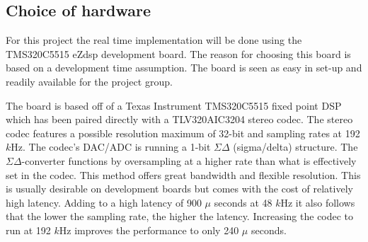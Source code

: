 

\subsection{Choice of hardware}\label{subsec:ChoiceOfHardware}

For this project the real time implementation will be done using the TMS320C5515 eZdsp development board. The reason for choosing this board is based on a development time assumption. The board is seen as easy in set-up and readily available for the project group. %

The board is based off of a Texas Instrument TMS320C5515 fixed point DSP which has been paired directly with a TLV320AIC3204 stereo codec. The stereo codec features a possible resolution maximum of 32-bit and sampling rates at 192 $k$Hz. The codec's DAC/ADC is running a 1-bit $\Sigma\Delta$ (sigma/delta) structure. The $\Sigma\Delta$-converter functions by oversampling at a higher rate than what is effectively set in the codec. This method offers great bandwidth and flexible resolution. This is usually desirable on development boards but comes with the cost of relatively high latency. Adding to a high latency of 900 $\mu$ seconds at 48 $k$Hz it also follows that the lower the sampling rate, the higher the latency. Increasing the codec to run at 192 $k$Hz improves the performance to only 240 $\mu$ seconds.



